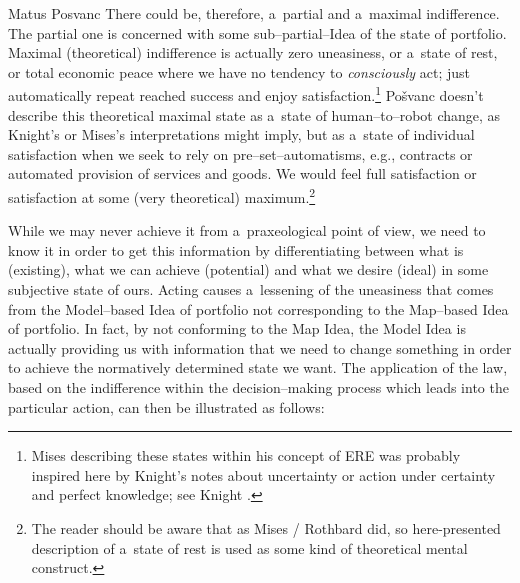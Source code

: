\begin{artengenv}{Matus Posvanc}
There could be, therefore, a~partial and a~maximal indifference. The partial one is concerned with some sub–partial–Idea of the state of portfolio. Maximal (theoretical) indifference is actually zero uneasiness, or a~state of rest, or total economic peace 
\parencite[as described by][]{Mises1998Human} %
 where we have no tendency to \textit{consciously} act; just automatically repeat reached success and enjoy satisfaction.\footnote{Mises describing these states within his concept of ERE was probably inspired here by Knight's notes about uncertainty or action under certainty and perfect knowledge; see Knight 
\parencites*[][]{Knight1964Risk}[][pp.201, 268, 294]{Knight1964Risk}.%
} Pošvanc 
\parencite*[][pp.203–211]{Posvanc2021Evolutionary} %
 doesn't describe this theoretical maximal state as a~state of human–to–robot change, as Knight's or Mises's interpretations might imply, but as a~state of individual satisfaction when we seek to rely on pre–set–automatisms, e.g., contracts or automated provision of services and goods. We would feel full satisfaction or satisfaction at some (very theoretical) maximum.\footnote{The reader should be aware that as Mises / Rothbard did, so here-presented description of a~state of rest is used as some kind of theoretical mental construct.}



While we may never achieve it from a~praxeological point of view, we need to know it in order to get this information by differentiating between what is (existing), what we can achieve (potential) and what we desire (ideal) in some subjective state of ours. Acting causes a~lessening of the uneasiness that comes from the Model–based Idea of portfolio not corresponding to the Map–based Idea of portfolio. In fact, by not conforming to the Map Idea, the Model Idea is actually providing us with information that we need to change something in order to achieve the normatively determined state we want. The application of the law, based on the indifference within the decision–making process which leads into the particular action, can then be illustrated as follows:



\end{artengenv}

